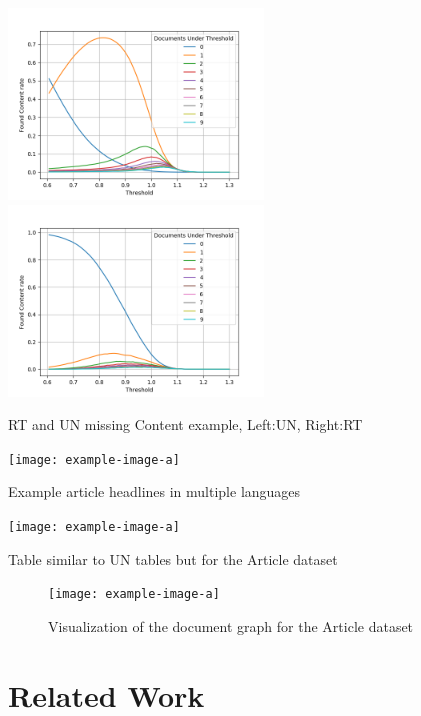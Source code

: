 \documentclass[11pt]{article}
\begin{document}
\begin{table}
    \centering
    \includegraphics[height=2in]{fr_en_un_equal_to.png}
    \includegraphics[height=2in]{fr_en_equal_to.png}
    \caption{RT and UN missing Content example, Left:UN, Right:RT}
\end{table}

\begin{table}
    \centering
    \texttt{[image: example-image-a]}
    \caption{Example article headlines in multiple languages}
\end{table}

\begin{table}
    \centering
    \texttt{[image: example-image-a]}
    \caption{Table similar to UN tables but for the Article dataset}
\end{table}

\begin{figure}
    \centering
    \texttt{[image: example-image-a]}
    \caption{Visualization of the document graph for the Article dataset}
\end{figure}

\section{Related Work}
\label{sec:related}
\end{document}
